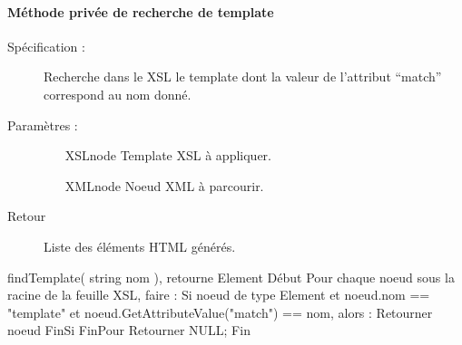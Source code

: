 \documentclass[10pt,a4paper]{article}
\begin{document}
\paragraph{Méthode privée de recherche de template}
\begin{description}
\item[Spécification :] Recherche dans le XSL le template dont la valeur de l’attribut “match” correspond au nom donné.
\item[Paramètres :]
\begin{itemize}
\item[XSLnode] Template XSL à appliquer.
\item[XMLnode] Noeud XML à parcourir.
\end{itemize}
\item[Retour] Liste des éléments HTML générés.
\end{description}

\begin{verbatimtab}
findTemplate( string nom ), retourne Element
Début
    Pour chaque noeud sous la racine de la feuille XSL, faire :
        Si noeud de type Element et noeud.nom == "template" et 
        noeud.GetAttributeValue("match") == nom, alors :
            Retourner noeud
        FinSi
    FinPour
    Retourner NULL;
Fin
\end{verbatimtab}
\end{document}
